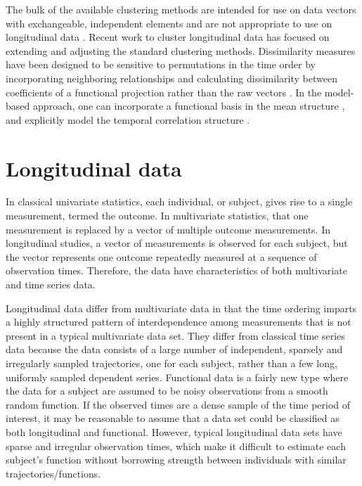 The bulk of the available clustering methods are intended for use on data vectors with exchangeable, independent elements and are not appropriate to use on longitudinal data \cite{everitt2009}. Recent work to cluster longitudinal data has focused on extending and adjusting the standard clustering methods. Dissimilarity measures have been designed to be sensitive to permutations in the time order by incorporating neighboring relationships \cite{chouakria2007} and calculating dissimilarity between coefficients of a functional projection rather than the raw vectors \cite{serban2005, tarpey2003, abraham2003, tarpey2007,hitchcock2007}. In the model-based approach, one can incorporate a functional basis in the mean structure \cite{nagin1999,gaffney1999}, and explicitly model the temporal correlation structure \cite{muthen1999,fraley1999,mcnicholas2010}. 

\section{Longitudinal data}
In classical univariate statistics, each individual, or subject, gives rise to a single measurement, termed the outcome. In multivariate statistics, that one measurement is replaced by a vector of multiple outcome measurements. In longitudinal studies, a vector of measurements is observed for each subject, but the vector represents one outcome repeatedly measured at a sequence of observation times. Therefore, the data have characteristics of both multivariate and time series data.

Longitudinal data differ from multivariate data in that the time ordering imparts a highly structured pattern of interdependence among measurements that is not present in a typical multivariate data set. They differ from classical time series data because the data consists of a large number of independent, sparsely and irregularly sampled trajectories, one for each subject, rather than a few long, uniformly sampled dependent series. Functional data is a fairly new type \cite{ramsay2005} where the data for a subject are assumed to be noisy observations from a smooth random function. If the observed times are a dense sample of the time period of interest, it may be reasonable to assume that a data set could be classified as both longitudinal and functional. However, typical longitudinal data sets have sparse and irregular observation times, which make it difficult to estimate each subject's function without borrowing strength between individuals with similar trajectories/functions.

